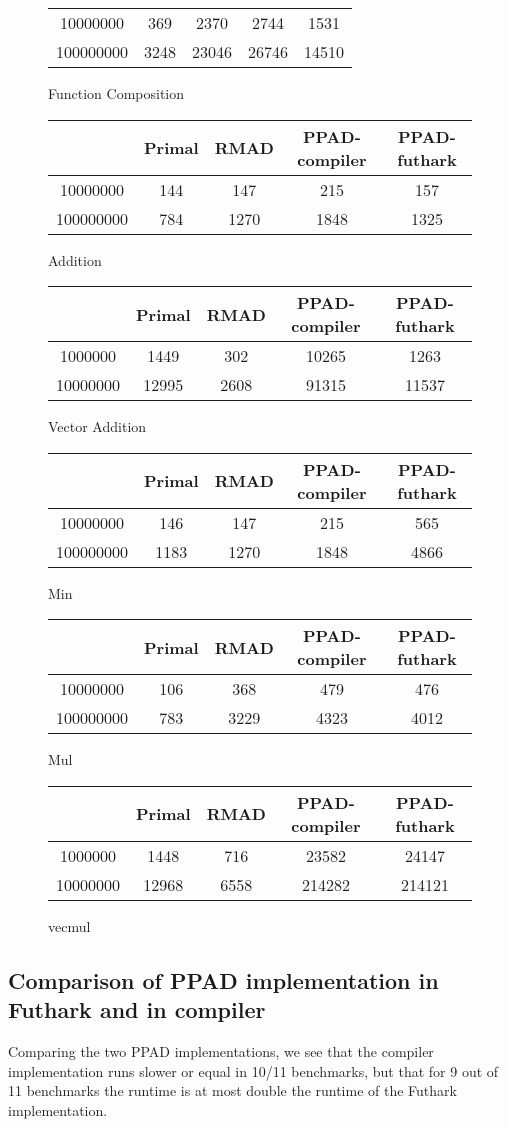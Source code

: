 \documentclass{article}
\begin{document}
\begin{figure}
\begin{tabular}{|c|c|c|c|c|}
		10000000  & 369    & 2370  & 2744          & 1531         \\
		100000000 & 3248   & 23046 & 26746         & 14510
	\end{tabular}
	\caption{Function Composition}
	\begin{tabular}{|c|c|c|c|c|}
		          & Primal & RMAD & PPAD-compiler & PPAD-futhark \\
		\hline

		10000000  & 144    & 147  & 215           & 157          \\
		100000000 & 784    & 1270 & 1848          & 1325
	\end{tabular}
	\caption{Addition}
	\begin{tabular}{|c|c|c|c|c|}
		         & Primal & RMAD & PPAD-compiler & PPAD-futhark \\
		\hline

		1000000  & 1449   & 302  & 10265         & 1263         \\
		10000000 & 12995  & 2608 & 91315         & 11537
	\end{tabular}
	\caption{Vector Addition}
	\begin{tabular}{|c|c|c|c|c|}
		          & Primal & RMAD & PPAD-compiler & PPAD-futhark \\
		\hline

		10000000  & 146    & 147  & 215           & 565          \\
		100000000 & 1183   & 1270 & 1848          & 4866
	\end{tabular}
	\caption{Min}
	\begin{tabular}{|c|c|c|c|c|}
		          & Primal & RMAD & PPAD-compiler & PPAD-futhark \\
		\hline

		10000000  & 106    & 368  & 479           & 476          \\
		100000000 & 783    & 3229 & 4323          & 4012
	\end{tabular}
	\caption{Mul}
	\begin{tabular}{|c|c|c|c|c|}
		         & Primal & RMAD & PPAD-compiler & PPAD-futhark \\
		\hline

		1000000  & 1448   & 716  & 23582         & 24147        \\
		10000000 & 12968  & 6558 & 214282        & 214121
	\end{tabular}
	\caption{vecmul}
\end{figure}

\subsection{Comparison of PPAD implementation in Futhark and in compiler}
Comparing the two PPAD implementations,
we see that the compiler implementation runs slower or equal in 10/11 benchmarks,
but that for 9 out of 11 benchmarks the runtime is at most double the
runtime of the Futhark implementation.
\end{document}
